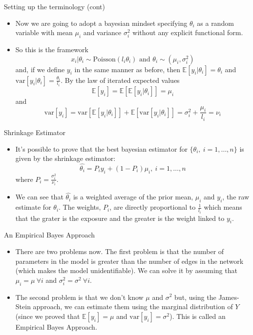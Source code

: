 \documentclass[c,10pt,pdftex]{beamer}
\begin{document}
\begin{frame}{Setting up the terminology (cont)}
\vspace{-0.75cm}
\begin{itemize}
	\setlength\itemsep{1em}
	\item Now we are going to adopt a bayesian mindset specifying $\theta_i$ as a random variable with mean $\mu_i$ and variance $\sigma^2_i$ without any explicit functional form. 
	
	\item So this is the framework 
	\[
	x_i | \theta_i \sim \text{Poisson}(l_i\theta_i) \text{ and } \theta_i \sim (\mu_i, \sigma^2_i)
	\]  
	and, if we define $y_i$ in the same manner as before, then $\mathbb{E}[y_i | \theta_i] = \theta_i$ and $\text{var}[y_i | \theta_i] = \frac{\theta_{i}}{l_i}$. By the law of iterated expected values 
	\[
	\mathbb{E}[y_i] = \mathbb{E}[\mathbb{E}[y_i|\theta_{i}]] = \mu_i
	\]
	and
	\[
	\text{var}[y_i] = \text{var}[\mathbb{E}[y_i | \theta_i]] + \mathbb{E}[\text{var}[y_i|\theta_{i}]] = \sigma^2_i + \frac{\mu_i}{l_i} = \nu_i
	\]
\end{itemize}
\end{frame}

\begin{frame}{Shrinkage Estimator}
\vspace{-0.75cm}
\begin{itemize}
	\setlength\itemsep{1em}
	\item It's possible to prove that the best bayesian estimator for $\lbrace \theta_{i}, \ i = 1, \dots, n \rbrace$ is given by the \alert{shrinkage estimator}:
	\[
	\hat{\theta_i} = P_iy_i + (1 - P_i)\mu_i, \ i = 1, \dots, n
	\]
	where $P_i = \frac{\sigma^2_i}{\nu_i}$. 
	
	\item We can see that $\hat{\theta_i}$ is a weighted average of the prior mean, $\mu_i$ and $y_i$, the raw estimate for $\theta_{i}$. The weights, $P_i$, are directly proportional to $\frac{1}{l_i}$ which means that the grater is the exposure and the greater is the weight linked to $y_i$. 
\end{itemize}
\end{frame}

\begin{frame}{An Empirical Bayes Approach}
\vspace{-0.75cm}
\begin{itemize}
	\setlength\itemsep{1em}
	\item There are two problems now. The first problem is that the number of parameters in the model is greater than the number of edges in the network (which makes the model unidentifiable). We can solve it by assuming that $\mu_i = \mu \ \forall i$ and $\sigma^2_i = \sigma^2 \ \forall i$. 
	
	\item The second problem is that we don't know $\mu$ and $\sigma^2$ but, using the James-Stein approach, we can estimate them using the marginal distribution of $Y$ (since we proved that $\mathbb{E}[y_i] = \mu$ and $\text{var}[y_i] = \sigma^2$). This is called an Empirical Bayes Approach. 
\end{itemize}
\end{frame}
\end{document}
